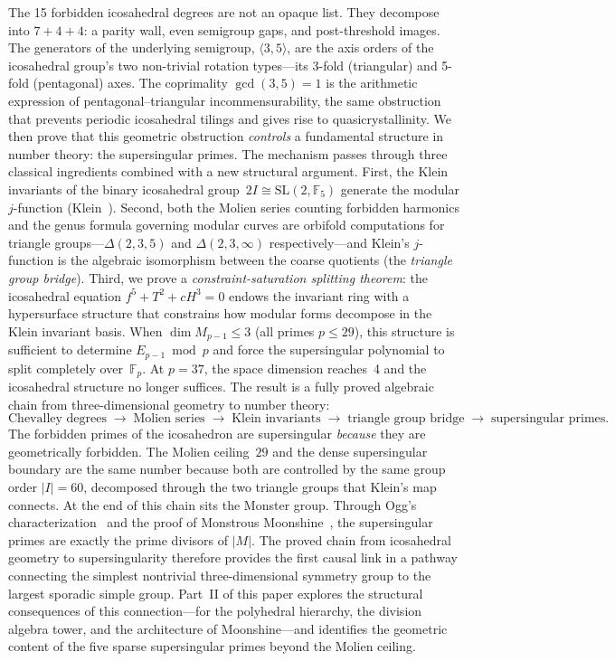 \documentclass[11pt,letterpaper]{article}
\theoremstyle{definition}
\newcommand{\FF}{\mathbb{F}}
\newcommand{\abs}[1]{\lvert #1 \rvert}
\newcommand{\gen}[1]{\langle #1 \rangle}
\begin{document}
The 15 forbidden icosahedral degrees are not an opaque list.  They decompose into $7+4+4$: a parity wall, even semigroup gaps, and post-threshold images.  The generators of the underlying semigroup, $\gen{3,5}$, are the axis orders of the icosahedral group's two non-trivial rotation types---its 3-fold (triangular) and 5-fold (pentagonal) axes.  The coprimality $\gcd(3,5)=1$ is the arithmetic expression of pentagonal--triangular incommensurability, the same obstruction that prevents periodic icosahedral tilings and gives rise to quasicrystallinity.
We then prove that this geometric obstruction \emph{controls} a fundamental structure in number theory: the supersingular primes.  The mechanism passes through three classical ingredients combined with a new structural argument.  First, the Klein invariants of the binary icosahedral group~$2I\cong\mathrm{SL}(2,\FF_5)$ generate the modular $j$-function (Klein~\cite{Klein1884}).  Second, both the Molien series counting forbidden harmonics and the genus formula governing modular curves are orbifold computations for triangle groups---$\Delta(2,3,5)$ and $\Delta(2,3,\infty)$ respectively---and Klein's $j$-function is the algebraic isomorphism between the coarse quotients (the \emph{triangle group bridge}).  Third, we prove a \emph{constraint-saturation splitting theorem}: the icosahedral equation $f^5+T^2+cH^3=0$ endows the invariant ring with a hypersurface structure that constrains how modular forms decompose in the Klein invariant basis.  When $\dim M_{p-1}\le 3$ (all primes $p\le 29$), this structure is sufficient to determine $E_{p-1}\bmod p$ and force the supersingular polynomial to split completely over~$\FF_p$.  At $p=37$, the space dimension reaches~4 and the icosahedral structure no longer suffices.
The result is a fully proved algebraic chain from three-dimensional geometry to number theory:
\[
\text{Chevalley degrees}\;\to\;\text{Molien series}\;\to\;\text{Klein invariants}\;\to\;\text{triangle group bridge}\;\to\;\text{supersingular primes.}
\]
The forbidden primes of the icosahedron are supersingular \emph{because} they are geometrically forbidden.  The Molien ceiling~$29$ and the dense supersingular boundary are the same number because both are controlled by the same group order $\abs{I}=60$, decomposed through the two triangle groups that Klein's map connects.
At the end of this chain sits the Monster group.  Through Ogg's characterization~\cite{Ogg1975} and the proof of Monstrous Moonshine~\cite{Borcherds1992}, the supersingular primes are exactly the prime divisors of $\abs{M}$.  The proved chain from icosahedral geometry to supersingularity therefore provides the first causal link in a pathway connecting the simplest nontrivial three-dimensional symmetry group to the largest sporadic simple group.  Part~II of this paper explores the structural consequences of this connection---for the polyhedral hierarchy, the division algebra tower, and the architecture of Moonshine---and identifies the geometric content of the five sparse supersingular primes beyond the Molien ceiling.
\end{document}
